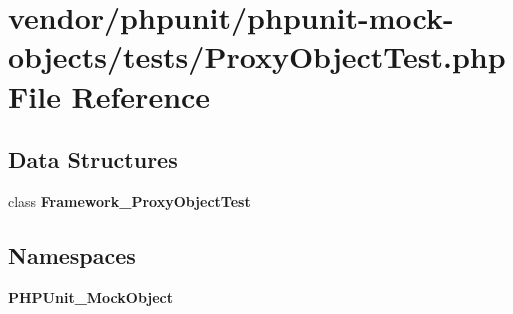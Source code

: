 \section{vendor/phpunit/phpunit-\/mock-\/objects/tests/\+Proxy\+Object\+Test.php File Reference}
\label{_proxy_object_test_8php}
\subsection*{Data Structures}
\begin{DoxyCompactItemize}
\item 
class {\bf Framework\+\_\+\+Proxy\+Object\+Test}
\end{DoxyCompactItemize}
\subsection*{Namespaces}
\begin{DoxyCompactItemize}
\item 
 {\bf P\+H\+P\+Unit\+\_\+\+Mock\+Object}
\end{DoxyCompactItemize}
